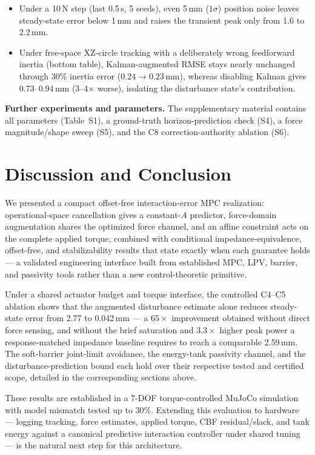 \documentclass[journal]{IEEEtran}
\begin{document}
\begin{itemize}[leftmargin=*,itemsep=1pt,topsep=2pt]
\item Under a 10\,N step (last 0.5\,s, 5 seeds), even 5\,mm ($1\sigma$)
position noise leaves steady-state error below 1\,mm and raises the transient
peak only from 1.6 to 2.2\,mm.
\item Under free-space XZ-circle tracking with a deliberately wrong
feedforward inertia (bottom table), Kalman-augmented RMSE stays
nearly unchanged through 30\% inertia error ($0.24\to0.23$\,mm), whereas
disabling Kalman gives 0.73--0.94\,mm (3--4$\times$ worse), isolating the
disturbance state's contribution.
\end{itemize}

\textbf{Further experiments and parameters.} The supplementary material
contains all parameters (Table~S1), a ground-truth horizon-prediction check
(S4), a force magnitude/shape sweep (S5), and the C8 correction-authority
ablation (S6).

\section{Discussion and Conclusion}

We presented a compact offset-free interaction-error MPC realization:
operational-space cancellation gives a constant-$A$ predictor, force-domain
augmentation shares the optimized force channel, and an affine constraint acts
on the complete applied torque, combined with conditional impedance-equivalence,
offset-free, and stabilizability results that state exactly when each
guarantee holds --- a validated engineering interface built from established
MPC, LPV, barrier, and passivity tools rather than a new control-theoretic
primitive.

Under a shared actuator budget and torque interface, the controlled C4--C5
ablation shows that the augmented disturbance estimate alone reduces
steady-state error from 2.77 to 0.042\,mm --- a $65\times$ improvement
obtained without direct force sensing, and without the brief saturation and
$3.3\times$ higher peak power a response-matched impedance baseline requires
to reach a comparable 2.59\,mm. The soft-barrier joint-limit avoidance, the
energy-tank passivity channel, and the disturbance-prediction bound each hold
over their respective tested and certified scope, detailed in the
corresponding sections above.

These results are established in a 7-DOF torque-controlled MuJoCo simulation
with model mismatch tested up to $30\%$. Extending this evaluation to
hardware --- logging tracking, force estimates, applied torque, CBF
residual/slack, and tank energy against a canonical predictive interaction
controller under shared tuning --- is the natural next step for this
architecture.



\end{document}
